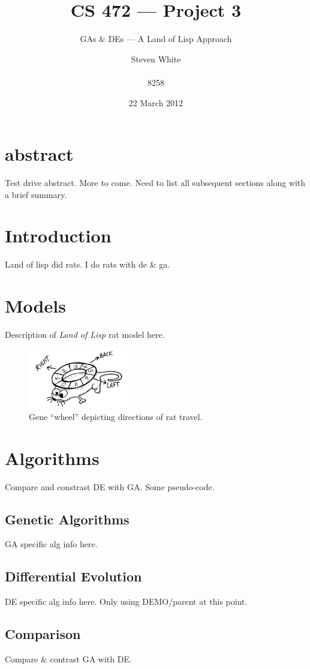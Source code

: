 \documentclass{sig-alternate}
\title{CS 472 --- Project 3}
\subtitle {GAs \& DEs --- A Land of Lisp Approach}
\author{
\alignauthor
Steven White \\
  \email{swhite24@mix.wvu.edu}\\
  8258
}
\begin{document}
\date{22 March 2012}

\maketitle
\section{abstract}
Test drive abstract. More to come.  Need to list all subsequent
sections along with a brief summary.

\section{Introduction}
Land of lisp did rats.  I do rats with de \& ga.

\section{Models}
Description of \emph{Land of Lisp} rat model here.

\begin{figure}
\centering
\includegraphics[width=0.4\textwidth]{rat_wheel.PNG}
\caption{Gene ``wheel'' depicting directions of rat travel.}
\end{figure}

\section{Algorithms}
Compare and constrast DE with GA.  Some pseudo-code.

\subsection{Genetic Algorithms}
GA specific alg info here.

\subsection{Differential Evolution}
DE specific alg info here. Only using DEMO/parent at this point.

\subsection{Comparison}
Compare \& contrast GA with DE.
\end{document}
